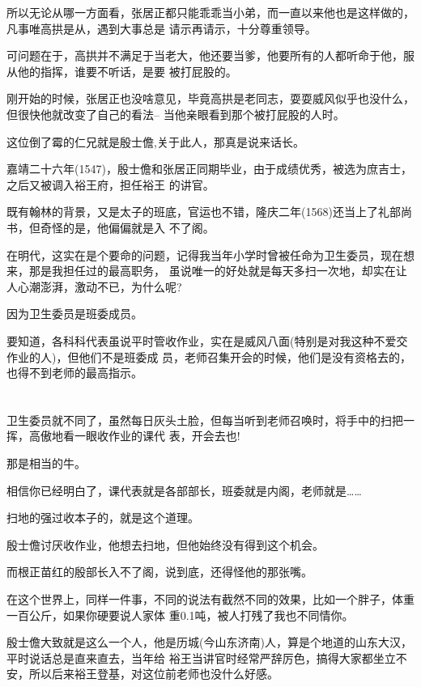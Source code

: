 \documentclass[11pt,a4paper,onecolumn]{article}
\begin{document}
所以无论从哪一方面看，张居正都只能乖乖当小弟，而一直以来他也是这样做的，凡事唯高拱是从，遇到大事总是
请示再请示，十分尊重领导。

可问题在于，高拱并不满足于当老大，他还要当爹，他要所有的人都听命于他，服从他的指挥，谁要不听话，是要
被打屁股的。

刚开始的时候，张居正也没啥意见，毕竟高拱是老同志，耍耍威风似乎也没什么，但很快他就改变了自己的看法--
当他亲眼看到那个被打屁股的人时。

这位倒了霉的仁兄就是殷士儋,关于此人，那真是说来话长。

嘉靖二十六年(1547)，殷士儋和张居正同期毕业，由于成绩优秀，被选为庶吉士，之后又被调入裕王府，担任裕王
的讲官。

既有翰林的背景，又是太子的班底，官运也不错，隆庆二年(1568)还当上了礼部尚书，但奇怪的是，他偏偏就是入
不了阁。

在明代，这实在是个要命的问题，记得我当年小学时曾被任命为卫生委员，现在想来，那是我担任过的最高职务，
虽说唯一的好处就是每天多扫一次地，却实在让人心潮澎湃，激动不已，为什么呢?

因为卫生委员是班委成员。

要知道，各科科代表虽说平时管收作业，实在是威风八面(特别是对我这种不爱交作业的人)，但他们不是班委成
员，老师召集开会的时候，他们是没有资格去的，也得不到老师的最高指示。

\section[\thesection]{}

卫生委员就不同了，虽然每日灰头土脸，但每当听到老师召唤时，将手中的扫把一挥，高傲地看一眼收作业的课代
表，开会去也!

那是相当的牛。

相信你已经明白了，课代表就是各部部长，班委就是内阁，老师就是……

扫地的强过收本子的，就是这个道理。

殷士儋讨厌收作业，他想去扫地，但他始终没有得到这个机会。

而根正苗红的殷部长入不了阁，说到底，还得怪他的那张嘴。

在这个世界上，同样一件事，不同的说法有截然不同的效果，比如一个胖子，体重一百公斤，如果你硬要说人家体
重0.1吨，被人打残了我也不同情你。

殷士儋大致就是这么一个人，他是历城(今山东济南)人，算是个地道的山东大汉，平时说话总是直来直去，当年给
裕王当讲官时经常严辞厉色，搞得大家都坐立不安，所以后来裕王登基，对这位前老师也没什么好感。
\end{document}
